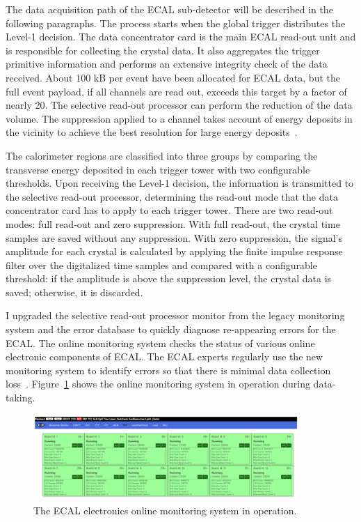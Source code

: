 The data acquisition path of the ECAL sub-detector will be described in the following paragraphs. The process starts when the global trigger distributes the Level-1 decision. The data concentrator card is the main ECAL read-out unit and is responsible for collecting the crystal data. It also aggregates the trigger primitive information and performs an extensive integrity check of the data received. About 100 kB per event have been allocated for ECAL data, but the full event payload, if all channels are read out, exceeds this target by a factor of nearly 20. The selective read-out processor can perform the reduction of the data volume. The suppression applied to a channel takes account of energy deposits in the vicinity to achieve the best resolution for large energy deposits~\cite{Almeida:2008zz}.

The calorimeter regions are classified into three groups by comparing the transverse energy deposited in each trigger tower with two configurable thresholds. Upon receiving the Level-1 decision, the information is transmitted to the selective read-out processor, determining the read-out mode that the data concentrator card has to apply to each trigger tower. There are two read-out modes: full read-out and zero suppression. With full read-out, the crystal time samples are saved without any suppression. With zero suppression, the signal's amplitude for each crystal is calculated by applying the finite impulse response filter over the digitalized time samples and compared with a configurable threshold: if the amplitude is above the suppression level, the crystal data is saved; otherwise, it is discarded.

I upgraded the selective read-out processor monitor from the legacy monitoring system and the error database to quickly diagnose re-appearing errors for the ECAL. The online monitoring system checks the status of various online electronic components of ECAL. The ECAL experts regularly use the new monitoring system to identify errors so that there is minimal data collection loss~\cite{Siddireddy:2018gxt}. Figure~\ref{fig:SRP} shows the online monitoring system in operation during data-taking.

\begin{figure}[htbp]
  \centering
  \includegraphics[width=0.9\textwidth]{plots/chapter3/SRP.png}
  \caption{The ECAL electronics online monitoring system in operation.}
  \label{fig:SRP}
\end{figure}

